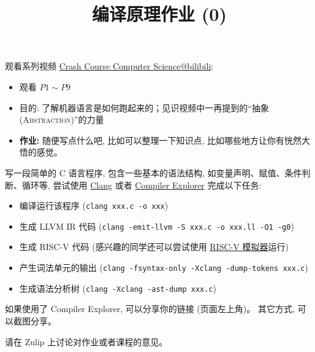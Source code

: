 \documentclass[a4paper, justified]{tufte-handout}
\title{编译原理作业 (0)}
\date{\zhtoday}
\begin{document}
\maketitle
\noplagiarism %
\begin{abstract}
\end{abstract}
\beginrequired
\begin{problem}[计算机系统基础]
  观看系列视频 \href{https://www.bilibili.com/video/BV1EW411u7th?}{Crash Course Computer Science@bilibili}:
  \begin{itemize}
    \item 观看 $P1 \sim P9$
    \item 目的: 了解机器语言是如何跑起来的；见识视频中一再提到的``抽象(\textsc{Abstraction})''的力量
    \item {\bf 作业:} 随便写点什么吧, 比如可以整理一下知识点, 比如哪些地方让你有恍然大悟的感觉。
  \end{itemize}
\end{problem}

\begin{solution}
\end{solution}

\beginoptional
\begin{problem}[编译器结构]
  写一段简单的 C 语言程序, 包含一些基本的语法结构, 如变量声明、赋值、条件判断、循环等,
  尝试使用 \href{https://godbolt.org/}{Clang} 或者 \href{https://godbolt.org/}{Compiler Explorer} 完成以下任务:
  \begin{itemize}
    \item 编译运行该程序 (\texttt{clang xxx.c -o xxx})
    \item 生成 LLVM IR 代码 (\texttt{clang -emit-llvm -S xxx.c -o xxx.ll -O1 -g0})
    \item 生成 RISC-V 代码 (感兴趣的同学还可以尝试使用 \href{https://github.com/TheThirdOne/rars}{RISC-V 模拟器}运行)
    \item 产生词法单元的输出 (\texttt{clang -fsyntax-only -Xclang -dump-tokens xxx.c})
    \item 生成语法分析树 (\texttt{clang -Xclang -ast-dump xxx.c})
  \end{itemize}
\end{problem}

\begin{solution}
  如果使用了 Compiler Explorer, 可以分享你的链接 (页面左上角)。
  其它方式, 可以截图分享。
\end{solution}



\beginfb

请在 Zulip 上讨论对作业或者课程的意见。
\end{document}
